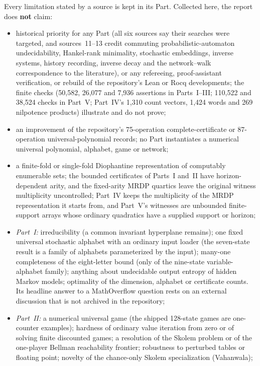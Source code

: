 \documentclass[11pt,letterpaper]{article}
\theoremstyle{definition}
\theoremstyle{remark}
\begin{document}
Every limitation stated by a source is kept in its Part. Collected here, the report does \textbf{not} claim:
\begin{itemize}
\item historical priority for any Part (all six sources say their searches were targeted, and sources~11--13 credit commuting probabilistic-automaton undecidability, Hankel-rank minimality, stochastic embeddings, inverse systems, history recording, inverse decay and the network--walk correspondence to the literature), or any refereeing, proof-assistant verification, or rebuild of the repository's Lean or Rocq developments; the finite checks (50,582, 26,077 and 7,936 assertions in Parts~I--III; 110,522 and 38,524 checks in Part~V; Part~IV's 1,310 count vectors, 1,424 words and 269 nilpotence products) illustrate and do not prove;
\item an improvement of the repository's 75-operation complete-certificate or 87-operation universal-polynomial records; no Part instantiates a numerical universal polynomial, alphabet, game or network;
\item a finite-fold or single-fold Diophantine representation of computably enumerable sets; the bounded certificates of Parts~I and~II have horizon-dependent arity, and the fixed-arity MRDP quartics leave the original witness multiplicity uncontrolled; Part~IV keeps the multiplicity of the MRDP representation it starts from, and Part~V's witnesses are unbounded finite-support arrays whose ordinary quadratics have a supplied support or horizon;
\item \emph{Part~I:} irreducibility (a common invariant hyperplane remains); one fixed universal stochastic alphabet with an ordinary input loader (the seven-state result is a family of alphabets parameterized by the input); many-one completeness of the eight-letter bound (only of the nine-state variable-alphabet family); anything about undecidable output entropy of hidden Markov models; optimality of the dimension, alphabet or certificate counts. Its headline answer to a MathOverflow question rests on an external discussion that is not archived in the repository;
\item \emph{Part~II:} a numerical universal game (the shipped 128-state games are one-counter examples); hardness of ordinary value iteration from zero or of solving finite discounted games; a resolution of the Skolem problem or of the one-player Bellman reachability frontier; robustness to perturbed tables or floating point; novelty of the chance-only Skolem specialization (Vahanwala);

\end{itemize}
\end{document}
